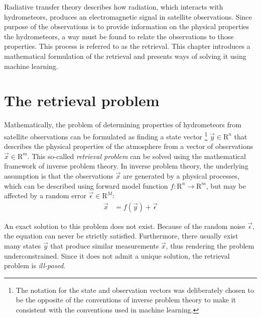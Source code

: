 Radiative transfer theory describes how radiation, which interacts with
hydrometeors, produces an electromagnetic signal in satellite observations.
Since purpose of the observations is to provide information on the physical
properties the hydrometeors, a way must be found to relate the observations to
those properties. This process is referred to as the retrieval. This chapter
introduces a mathematical formulation of the retrieval and presents ways of
solving it using machine learning.


\section{The retrieval problem}
\label{sec:machine_learning:retrieval_problem}


Mathematically, the problem of determining properties of hydrometeors from
satellite observations can be formulated as finding a state vector%
\footnote{ The notation for the state and observation vectors was deliberately
chosen to be the opposite of the conventions of inverse problem theory to make
it consistent with the conventions used in machine learning. }
$\vec{y} \in \mathrm{R}^{n}$ that describes the physical properties of the atmosphere from a
vector of observations $\vec{x} \in \mathrm{R}^{m}$. This so-called
\textit{retrieval problem} can be solved using the mathematical framework of
inverse problem theory. In inverse problem theory, the underlying assumption is
that the observations $\vec{x}$ are generated by a physical processes, which
can be described using forward model function $f: \mathrm{R}^n \rightarrow
\mathrm{R}^m$, but may be affected by a random error $\vec{\epsilon} \in
\mathrm{R}^M$:
\begin{align}\label{eq:inverse_problem}
  \vec{x} &= f(\vec{y}) + \vec{\epsilon}
\end{align}

An exact solution to this problem does not exist. Because of the random noise
$\vec{\epsilon}$, the equation can never be strictly satisfied. Furthermore,
there usually exist many states $\vec{y}$ that produce similar measurements
$\vec{x}$, thus rendering the problem underconstrained. Since it does not
admit a unique solution, the retrieval problem is \textit{ill-posed}.

